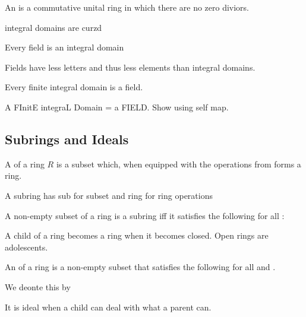\begin{D} An  is a commutative unital ring in which there are no zero diviors. \end{D}
\begin{R} integral domains are curzd \end{R}

\begin{T} Every field is an integral domain \end{T}
\begin{R} Fields have less letters and thus less elements than integral domains. \end{R}

\begin{T} Every finite integral domain is a field. \end{T}
\begin{R} A FInitE integraL Domain = a FIELD. Show using self map. \end{R}









\subsection{Subrings and Ideals}
\begin{D} A  of a ring $R$ is a subset  which, when equipped with the operations from  forms a ring. \end{D}
\begin{R} A subring has sub for subset and ring for ring operations \end{R}

\begin{Le} A non-empty subset  of a ring  is a subring iff it satisfies the following for all : \begin{compactitem}
\item {}
\item {}
\end{compactitem}
\end{Le}
\begin{R} A child of a ring becomes a ring when it becomes closed. Open rings are adolescents. \end{R}

\begin{D} An  of a ring  is a non-empty subset  that satisfies the following for all  and .
\begin{compactitem}
\item {}
\item {}
\end{compactitem}
We deonte this by 
\end{D}
\begin{R} It is ideal when a child can deal with what a parent can. \end{R}

